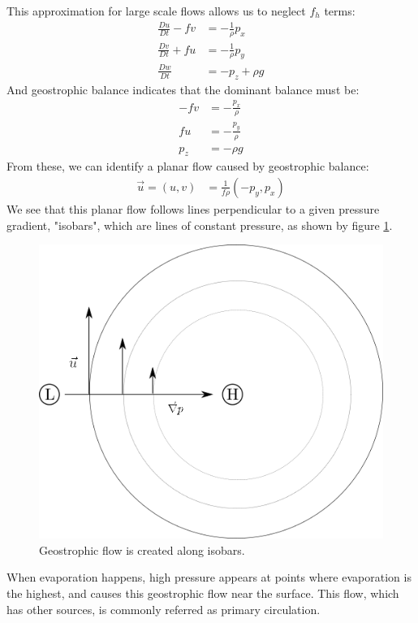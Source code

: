 This approximation for large scale flows allows us to neglect $f_h$ terms:
\begin{align}
    \label{eqn:mom1}
    \frac{Du}{Dt}-fv &= -\frac{1}{\rho}p_x\\
    \label{eqn:mom2}
    \frac{Dv}{Dt}+fu &= -\frac{1}{\rho}p_y\\
    \frac{Dw}{Dt} &=-p_z+\rho g
\end{align}
And geostrophic balance indicates that the dominant balance must be:
\begin{align}
    -fv &= -\frac{p_x}{\rho}\\
    fu &= -\frac{p_y}{\rho}\\
    \label{eqn:hydrobal}
    p_z &= -\rho g
\end{align}
From these, we can identify a planar flow caused by geostrophic balance:
\begin{align*}
    \vec{u} = (u,v) &= \frac{1}{f\rho}\left(-p_y, p_x\right)
\end{align*}
We see that this planar flow follows lines perpendicular to a given pressure gradient, "isobars", which are lines of constant pressure, as shown by figure \ref{fig:fig3}.
\begin{figure}
    \centering
    \includegraphics[width=0.5\linewidth]{assets/figure-3.png}
    \caption{Geostrophic flow is created along isobars.}
    \label{fig:fig3}
\end{figure}

When evaporation happens, high pressure appears at points where evaporation is the highest, and causes this geostrophic flow near the surface. This flow, which has other sources, is commonly referred as primary circulation.

